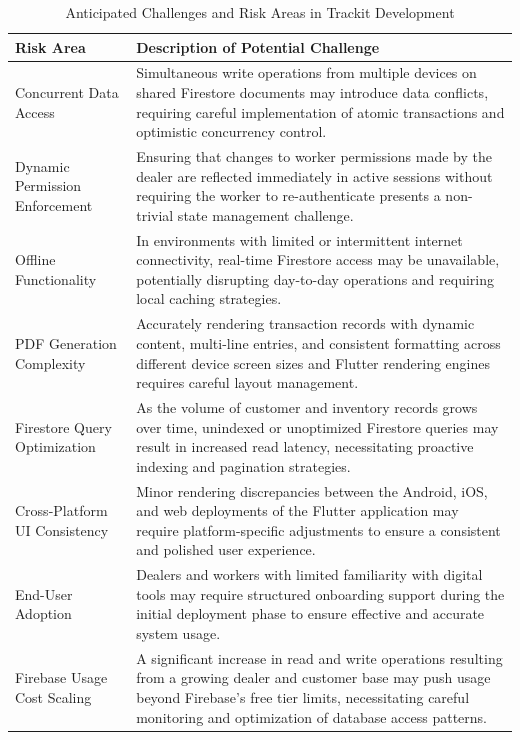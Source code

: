 \documentclass[12pt, oneside]{article}
\begin{document}
\begin{table}[h!]
\centering
\caption{Anticipated Challenges and Risk Areas in Trackit Development}
\vspace{0.5em}
\label{tab:hurdles}
\renewcommand{\arraystretch}{1.5}
\begin{tabular}{|p{3.8cm}|p{9.8cm}|}
\hline
\textbf{Risk Area} & \textbf{Description of Potential Challenge} \\
\hline
Concurrent Data Access & Simultaneous write operations from multiple devices on shared Firestore documents may introduce data conflicts, requiring careful implementation of atomic transactions and optimistic concurrency control. \\
\hline
Dynamic Permission Enforcement & Ensuring that changes to worker permissions made by the dealer are reflected immediately in active sessions without requiring the worker to re-authenticate presents a non-trivial state management challenge. \\
\hline
Offline Functionality & In environments with limited or intermittent internet connectivity, real-time Firestore access may be unavailable, potentially disrupting day-to-day operations and requiring local caching strategies. \\
\hline
PDF Generation Complexity & Accurately rendering transaction records with dynamic content, multi-line entries, and consistent formatting across different device screen sizes and Flutter rendering engines requires careful layout management. \\
\hline
Firestore Query Optimization & As the volume of customer and inventory records grows over time, unindexed or unoptimized Firestore queries may result in increased read latency, necessitating proactive indexing and pagination strategies. \\
\hline
Cross-Platform UI Consistency & Minor rendering discrepancies between the Android, iOS, and web deployments of the Flutter application may require platform-specific adjustments to ensure a consistent and polished user experience. \\
\hline
End-User Adoption & Dealers and workers with limited familiarity with digital tools may require structured onboarding support during the initial deployment phase to ensure effective and accurate system usage. \\
\hline
Firebase Usage Cost Scaling & A significant increase in read and write operations resulting from a growing dealer and customer base may push usage beyond Firebase's free tier limits, necessitating careful monitoring and optimization of database access patterns. \\
\hline
\end{tabular}
\end{table}
\end{document}
